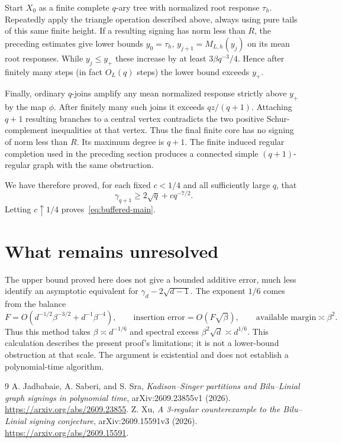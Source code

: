 \documentclass[11pt]{article}
\numberwithin{equation}{section}
\begin{document}
Start $X_0$ as a finite complete $q$-ary tree with normalized root
response $\tau_h$. Repeatedly apply the triangle operation described
above, always using pure tails of this same finite height. If a
resulting signing has norm less than $R$, the preceding estimates
give lower bounds $y_0=\tau_h$, $y_{j+1}=M_{L,h}(y_j)$ on its mean
root responses. While $y_j\le y_+$ these increase by at least
$3\beta q^{-3}/4$. Hence after finitely many steps (in fact
$O_L(q)$ steps) the lower bound exceeds $y_+$.

Finally, ordinary $q$-joins amplify any mean normalized response
strictly above $y_+$ by the map $\phi$. After finitely many such
joins it exceeds $qz/(q+1)$. Attaching $q+1$ resulting branches to
a central vertex contradicts the two positive Schur-complement
inequalities at that vertex. Thus the final finite core has no
signing of norm less than $R$. Its maximum degree is $q+1$.
The finite induced regular completion used in the preceding section
produces a connected simple $(q+1)$-regular graph with the same
obstruction.

We have therefore proved, for each fixed $c<1/4$ and all sufficiently
large $q$, that
\[
 \gamma_{q+1}\ge2\sqrt q+cq^{-7/2}.
\]
Letting $c\uparrow1/4$ proves~\eqref{eq:buffered-main}.

\section{What remains unresolved}
The upper bound proved here does not give a bounded additive error,
much less identify an asymptotic equivalent for
$\gamma_d-2\sqrt{d-1}$. The exponent $1/6$ comes from the balance
\[
 F=O(d^{-1/2}\beta^{-3/2}+d^{-1}\beta^{-4}),\qquad
 \text{insertion error}=O(F\sqrt\beta),\qquad
 \text{available margin}\asymp\beta^2.
\]
Thus this method takes $\beta\asymp d^{-1/6}$ and spectral excess
$\beta^2\sqrt d\asymp d^{1/6}$. This calculation describes the
present proof's limitations; it is not a lower-bound obstruction
at that scale. The argument is existential and does not establish
a polynomial-time algorithm.

\begin{thebibliography}{9}
 A. Jadbabaie, A. Saberi, and S. Sra,
\emph{Kadison--Singer partitions and Bilu--Linial graph signings in
polynomial time}, arXiv:2609.23855v1 (2026).
\url{https://arxiv.org/abs/2609.23855}.
 Z. Xu, \emph{A 3-regular counterexample to the Bilu--Linial
signing conjecture}, arXiv:2609.15591v3 (2026).
\url{https://arxiv.org/abs/2609.15591}.
\end{thebibliography}
\end{document}
